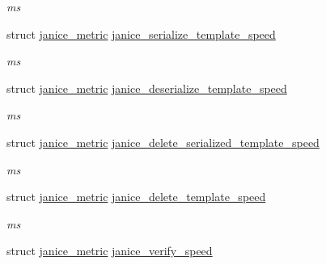 \begin{DoxyCompactItemize}
\begin{DoxyCompactList}\small\item\em ms \end{DoxyCompactList}\item 
\hypertarget{structjanice__metrics_a79727ef841406e0a8507e63f4ef5a7d8}{}struct \hyperlink{structjanice__metric}{janice\+\_\+metric} \hyperlink{structjanice__metrics_a79727ef841406e0a8507e63f4ef5a7d8}{janice\+\_\+serialize\+\_\+template\+\_\+speed}\label{structjanice__metrics_a79727ef841406e0a8507e63f4ef5a7d8}

\begin{DoxyCompactList}\small\item\em ms \end{DoxyCompactList}\item 
\hypertarget{structjanice__metrics_ae18b8c019f99bc22b50541da10cd2e44}{}struct \hyperlink{structjanice__metric}{janice\+\_\+metric} \hyperlink{structjanice__metrics_ae18b8c019f99bc22b50541da10cd2e44}{janice\+\_\+deserialize\+\_\+template\+\_\+speed}\label{structjanice__metrics_ae18b8c019f99bc22b50541da10cd2e44}

\begin{DoxyCompactList}\small\item\em ms \end{DoxyCompactList}\item 
\hypertarget{structjanice__metrics_a7249178b764e4d560122c697758b8df8}{}struct \hyperlink{structjanice__metric}{janice\+\_\+metric} \hyperlink{structjanice__metrics_a7249178b764e4d560122c697758b8df8}{janice\+\_\+delete\+\_\+serialized\+\_\+template\+\_\+speed}\label{structjanice__metrics_a7249178b764e4d560122c697758b8df8}

\begin{DoxyCompactList}\small\item\em ms \end{DoxyCompactList}\item 
\hypertarget{structjanice__metrics_a79a75cbb993bca31babb750e6bf4edd8}{}struct \hyperlink{structjanice__metric}{janice\+\_\+metric} \hyperlink{structjanice__metrics_a79a75cbb993bca31babb750e6bf4edd8}{janice\+\_\+delete\+\_\+template\+\_\+speed}\label{structjanice__metrics_a79a75cbb993bca31babb750e6bf4edd8}

\begin{DoxyCompactList}\small\item\em ms \end{DoxyCompactList}\item 
\hypertarget{structjanice__metrics_a0b3110f555aa6f496ad2733269c631ee}{}struct \hyperlink{structjanice__metric}{janice\+\_\+metric} \hyperlink{structjanice__metrics_a0b3110f555aa6f496ad2733269c631ee}{janice\+\_\+verify\+\_\+speed}\label{structjanice__metrics_a0b3110f555aa6f496ad2733269c631ee}


\end{DoxyCompactItemize}
